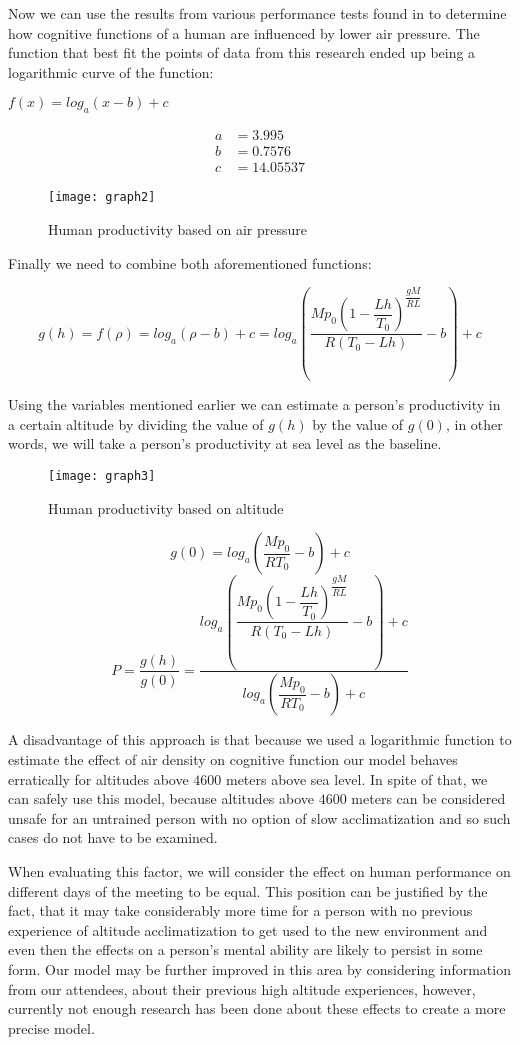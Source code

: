 Now we can use the results from various performance tests found in \cite{Research1996} to determine how cognitive functions of a human are influenced by lower air pressure. The function that best fit the points of data from this research ended up being a logarithmic curve of the function:
\begin{center}
$f(x)=log_a\left(x-b\right)+c$
\end{center}
\begin{align*}
a &= 3.995\\
b &= 0.7576\\
c &= 14.05537
\end{align*}

\begin{figure}[ht]
    \centering
        \texttt{[image: graph2]}
    \caption{Human productivity based on air pressure}
\end{figure}

Finally we need to combine both aforementioned functions:

$$g(h)=f(\rho)=log_a\left(\rho-b\right)+c=log_a\left(\dfrac{M p_0 \left(1-\dfrac{Lh}{T_0}\right)^{\dfrac{gM}{RL}}  }{ R (T_0-Lh)  }-b\right)+c$$

Using the variables mentioned earlier we can estimate a person's productivity in a certain altitude by dividing the value of $g(h)$ by the value of $g(0)$, in other words, we will take a person's productivity at sea level as the baseline. 

\begin{figure}[ht]
    \centering
        \texttt{[image: graph3]}
    \caption{Human productivity based on altitude}
\end{figure}

$$ g(0) = log_a\left(\dfrac{M p_0 }{ R T_0  }-b\right)+c$$
$$P = \frac{g(h)}{g(0)} = \frac{ log_a\left(\dfrac{M p_0 \left(1-\dfrac{Lh}{T_0}\right)^{\dfrac{gM}{RL}}  }{ R (T_0-Lh)  }-b\right)+c }{ log_a\left(\dfrac{M p_0 }{ R T_0  }-b\right)+c }$$

A disadvantage of this approach is that because we used a logarithmic function to estimate the effect of air density on cognitive function our model behaves erratically for altitudes above $4600$ meters above sea level. In spite of that, we can safely use this model, because altitudes above $4600$ meters can be considered unsafe for an untrained person with no option of slow acclimatization and so such cases do not have to be examined.

When evaluating this factor, we will consider the effect on human performance on different days of the meeting to be equal. This position can be justified by the fact, that it may take considerably more time for a person with no previous experience of altitude acclimatization to get used to the new environment and even then the effects on a person's mental ability are likely to persist in some form. Our model may be further improved in this area by considering information from our attendees, about their previous high altitude experiences, however, currently not enough research has been done about these effects to create a more precise model.
